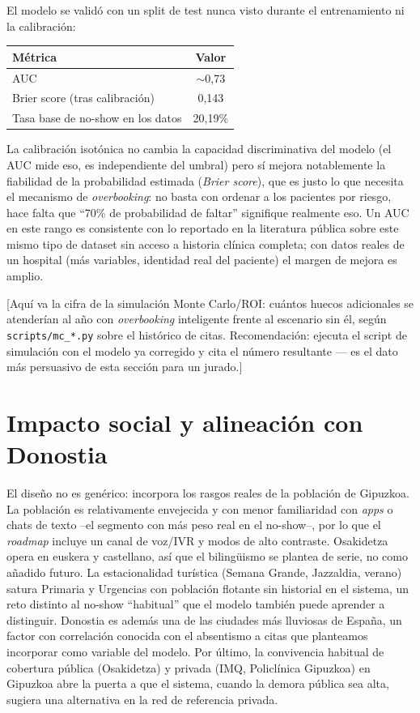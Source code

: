 \documentclass[11pt,a4paper]{article}
\begin{document}
El modelo se validó con un split de test nunca visto durante el entrenamiento ni la calibración:

\begin{center}
\begin{tabular}{lc}
\toprule
\textbf{Métrica} & \textbf{Valor} \\
\midrule
AUC & $\sim$0,73 \\
Brier score (tras calibración) & 0,143 \\
Tasa base de no-show en los datos & 20,19\% \\
\bottomrule
\end{tabular}
\end{center}

La calibración isotónica no cambia la capacidad discriminativa del modelo (el AUC mide eso, es independiente del umbral) pero sí mejora notablemente la fiabilidad de la probabilidad estimada (\textit{Brier score}), que es justo lo que necesita el mecanismo de \textit{overbooking}: no basta con ordenar a los pacientes por riesgo, hace falta que ``70\% de probabilidad de faltar'' signifique realmente eso. Un AUC en este rango es consistente con lo reportado en la literatura pública sobre este mismo tipo de dataset sin acceso a historia clínica completa; con datos reales de un hospital (más variables, identidad real del paciente) el margen de mejora es amplio.

[Aquí va la cifra de la simulación Monte Carlo/ROI: cuántos huecos adicionales se atenderían al año con \textit{overbooking} inteligente frente al escenario sin él, según \texttt{scripts/mc\_*.py} sobre el histórico de citas. Recomendación: ejecuta el script de simulación con el modelo ya corregido y cita el número resultante --- es el dato más persuasivo de esta sección para un jurado.]

\section{Impacto social y alineación con Donostia}

El diseño no es genérico: incorpora los rasgos reales de la población de Gipuzkoa. La población es relativamente envejecida y con menor familiaridad con \textit{apps} o chats de texto --el segmento con más peso real en el no-show--, por lo que el \textit{roadmap} incluye un canal de voz/IVR y modos de alto contraste. Osakidetza opera en euskera y castellano, así que el bilingüismo se plantea de serie, no como añadido futuro. La estacionalidad turística (Semana Grande, Jazzaldia, verano) satura Primaria y Urgencias con población flotante sin historial en el sistema, un reto distinto al no-show ``habitual'' que el modelo también puede aprender a distinguir. Donostia es además una de las ciudades más lluviosas de España, un factor con correlación conocida con el absentismo a citas que planteamos incorporar como variable del modelo. Por último, la convivencia habitual de cobertura pública (Osakidetza) y privada (IMQ, Policlínica Gipuzkoa) en Gipuzkoa abre la puerta a que el sistema, cuando la demora pública sea alta, sugiera una alternativa en la red de referencia privada.
\end{document}
